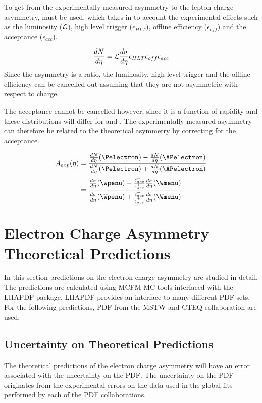 To get from the experimentally measured asymmetry to the lepton charge
asymmetry,  must be used, which takes in to
account the experimental effects such as the luminosity (${\cal L}$), high
level trigger ($\epsilon_{HLT}$), offline efficiency ($ \epsilon_{off}$) and
the acceptance ($\epsilon_{acc}$).

\begin{equation}
\frac{dN}{d\eta} = {\cal L } \frac{d\sigma}{d\eta}  \epsilon_{HLT}
\epsilon_{off} \epsilon_{acc}
\label{eq:NumEve}
\end{equation} 
Since the asymmetry is a ratio, the luminosity, high level trigger and the
offline efficiency can be cancelled out assuming that they are not asymmetric
with respect to charge. 

The acceptance cannot be cancelled however, since it is a function of rapidity and 
these distributions will differ for \Pelectron and \APelectron.
The experimentally measured asymmetry can therefore be related to the
theoretical asymmetry by correcting for the acceptance.

\begin{align} 
A_{exp}(\eta) &= \frac{ \frac{dN}{d\eta}(\Pelectron) -
\frac{dN}{d\eta}(\APelectron) }{ \frac{dN}{d\eta}(\Pelectron) +
\frac{dN}{d\eta}(\APelectron) }\\   
              &= \frac{ \frac{d\sigma}{d\eta}(\Wpenu) -
\frac{\epsilon^{-}_{acc}}{\epsilon^{+}_{acc}} \frac{d\sigma}{d\eta}(\Wmenu) }{
\frac{d\sigma}{d\eta}(\Wpenu) + \frac{\epsilon^{-}_{acc}}{\epsilon^{+}_{acc}}
\frac{d\sigma}{d\eta}(\Wmenu) }
\label{eq:AsymExpCorr}
\end{align}

\section{Electron Charge Asymmetry Theoretical Predictions}

In this section predictions on the electron charge asymmetry are studied in detail.
The predictions are calculated using \ac{MCFM}\cite{mcfm} \ac{MC} tools interfaced with the
\ac{LHAPDF} package\cite{lhapdf}. 
\ac{LHAPDF} provides an interface to many different \ac{PDF} sets. For the
following predictions, \ac{PDF} from  the \ac{MSTW} and \ac{CTEQ} collaboration
are used.

\subsection{Uncertainty on Theoretical Predictions}
The theoretical predictions of the electron charge asymmetry will have an error
associated with the uncertainty on the \ac{PDF}.
The uncertainty on the \ac{PDF} originates from the experimental errors on the
data used in the global fits performed by each of the \ac{PDF} collaborations.

